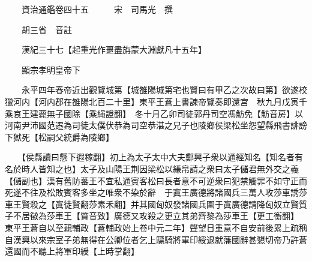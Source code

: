 










 


 
 


 

  
  
  
  
  





  
  
  
  
  
 
  

  

  
  
  



  

 
 

  
   




  

  
  


  　　資治通鑑卷四十五　　　宋　司馬光　撰

　　胡三省　音註

　　漢紀三十七【起重光作噩盡旃蒙大淵獻凡十五年】

　　顯宗孝明皇帝下

　　永平四年春帝近出觀覽城第【城雒陽城第宅也賢曰有甲乙之次故曰第】欲遂校獵河内【河内郡在雒陽北百二十里】東平王蒼上書諫帝覽奏即還宫　秋九月戊寅千乘哀王建薨無子國除【乘䋲證翻】　冬十月乙卯司徒郭丹司空馮魴免【魴音房】以河南尹沛國范遷為司徒太僕伏恭為司空恭湛之兄子也陵鄉侯梁松坐怨望縣飛書誹謗下獄死【松嗣父統爵為陵鄉】

　　【侯縣讀曰懸下遐稼翻】初上為太子太中大夫鄭興子衆以通經知名【知名者有名於時人皆知之也】太子及山陽王荆因梁松以縑帛請之衆曰太子儲君無外交之義【儲副也】漢有舊防蕃王不宜私通賓客松曰長者意不可逆衆曰犯禁觸罪不如守正而死遂不往及松敗賓客多坐之唯衆不染於辭　于寘王廣德將諸國兵三萬人攻莎車誘莎車王賢殺之【寘徒賢翻莎素禾翻】并其國匈奴發諸國兵圍于寘廣德請降匈奴立賢質子不居徵為莎車王【質音致】廣德又攻殺之更立其弟齊黎為莎車王【更工衡翻】　東平王蒼自以至親輔政【蒼輔政始上卷中元二年】聲望日重意不自安前後累上疏稱自漢興以來宗室子弟無得在公卿位者乞上驃騎將軍印綬退就藩國辭甚懇切帝乃許蒼還國而不聽上將軍印綬【上時掌翻】

